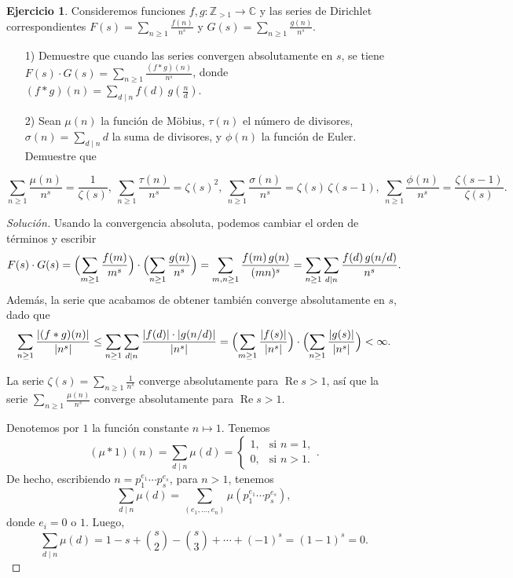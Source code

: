 \documentclass{article}
\newcounter{tarea}
\theoremstyle{definition}
\newtheorem{ejercicio}{Ejercicio}[tarea]
\newenvironment{solucion}{\begin{proof}[Solución]}{\end{proof}}
\newcommand{\ZZ}{\mathbb{Z}}
\newcommand{\CC}{\mathbb{C}}
\renewcommand{\Re}{\operatorname{Re}}
\begin{document}
\begin{ejercicio}
  Consideremos funciones $f,g\colon \ZZ_{>1} \to \CC$ y las series de
  Dirichlet correspondientes
  $F (s) = \sum_{n\ge 1} \frac{f(n)}{n^s}$ y
  $G (s) = \sum_{n\ge 1} \frac{g(n)}{n^s}$.

  \begin{enumerate}
  \item[1)] Demuestre que cuando las series convergen absolutamente en $s$,
    se tiene
    $F (s)\cdot G (s) = \sum_{n\ge 1} \frac{(f\ast g) (n)}{n^s}$,
    donde
    $(f\ast g) (n) = \sum_{d\mid n} f (d) \, g \left(\frac{n}{d}\right)$.

  \item[2)] Sean $\mu (n)$ la función de Möbius,
    $\tau (n)$ el número de divisores,
    $\sigma (n) = \sum_{d \mid n} d$ la suma de divisores,
    y $\phi (n)$ la función de Euler. Demuestre que
  \end{enumerate}
  \[ \sum_{n\ge 1} \frac{\mu (n)}{n^s} = \frac{1}{\zeta (s)}, ~
     \sum_{n\ge 1} \frac{\tau (n)}{n^s} = \zeta (s)^2, ~
     \sum_{n\ge 1} \frac{\sigma (n)}{n^s} = \zeta (s)\,\zeta (s-1), ~
     \sum_{n\ge 1} \frac{\phi (n)}{n^s} = \frac{\zeta (s-1)}{\zeta (s)}. \]

  \ifdefined\solutions
  \begin{solucion}
    Usando la convergencia absoluta, podemos cambiar el orden de términos
    y escribir
    \[ F (s)\cdot G (s)
    = \Bigl(\sum_{m\ge 1} \frac{f (m)}{m^s}\Bigr) \cdot
    \Bigl(\sum_{n\ge 1} \frac{g (n)}{n^s}\Bigr)
    = \sum_{m,n\ge 1} \frac{f (m) \, g (n)}{(mn)^s}
    = \sum_{n\ge 1} \sum_{d \mid n} \frac{f (d) \, g (n/d)}{n^s}. \]
    Además, la serie que acabamos de obtener también converge absolutamente
    en $s$, dado que
    \[ \sum_{n\ge 1} \frac{|(f \ast g) (n)|}{|n^s|} \le
    \sum_{n\ge 1} \sum_{d\mid n} \frac{|f (d)|\cdot |g (n/d)|}{|n^s|} =
    \Bigl(\sum_{m\ge 1} \frac{|f (s)|}{|n^s|}\Bigr)\cdot
    \Bigl(\sum_{n\ge 1} \frac{|g (s)|}{|n^s|}\Bigr) < \infty. \]

    La serie $\zeta (s) = \sum_{n\ge 1} \frac{1}{n^s}$ converge
    absolutamente para
    $\Re s > 1$, así que la serie $\sum_{n\ge 1} \frac{\mu (n)}{n^s}$
    converge absolutamente para $\Re s > 1$.

    Denotemos por $1$ la función constante $n \mapsto 1$. Tenemos
    \[ (\mu\ast 1) (n) = \sum_{d\mid n} \mu (d) = \begin{cases}
      1, & \text{si }n = 1,\\
      0, & \text{si }n > 1.
    \end{cases}. \]
    De hecho, escribiendo $n = p_1^{e_1}\cdots p_s^{e_s}$, para $n > 1$, tenemos
    $$\sum_{d\mid n} \mu (d) = \sum_{(e_1,\ldots,e_n)} \mu (p_1^{e_1}\cdots p_s^{e_s}),$$
    donde $e_i = 0$ o $1$. Luego,
    \[ \sum_{d\mid n} \mu (d) = 1 - s + {s \choose 2} - {s \choose 3} + \cdots + (-1)^s
    = (1-1)^s = 0. \]


\end{solucion}
\end{ejercicio}
\end{document}
